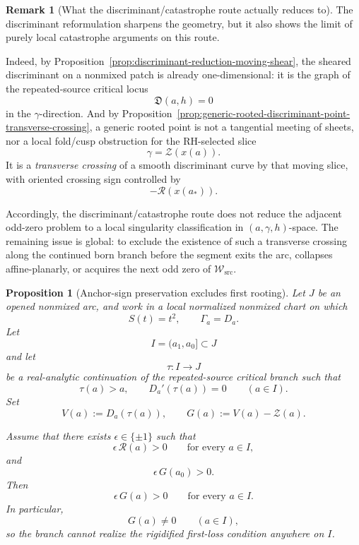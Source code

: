 \documentclass[11pt,a4paper]{amsart}
\theoremstyle{plain}
\newtheorem{proposition}[theorem]{Proposition}
\theoremstyle{definition}
\newtheorem{remark}[theorem]{Remark}
\begin{document}
\begin{remark}[What the discriminant/catastrophe route actually reduces to]
\label{rem:what-discriminant-catastrophe-route-actually-reduces-to}
The discriminant reformulation sharpens the geometry, but it also shows the
limit of purely local catastrophe arguments on this route.

Indeed, by
Proposition~\ref{prop:discriminant-reduction-moving-shear},
the sheared discriminant on a nonmixed patch is already one-dimensional:
it is the graph of the repeated-source critical locus
\[
\mathfrak D(a,h)=0
\]
in the $\gamma$-direction. And by
Proposition~\ref{prop:generic-rooted-discriminant-point-transverse-crossing},
a generic rooted point is not a tangential meeting of sheets, nor a local
fold/cusp obstruction for the RH-selected slice
\[
\gamma=\mathcal Z(x(a)).
\]
It is a \emph{transverse crossing} of a smooth discriminant curve by that
moving slice, with oriented crossing sign controlled by
\[
-\mathcal R(x(a_*)).
\]

Accordingly, the discriminant/catastrophe route does not reduce the adjacent
odd-zero problem to a local singularity classification in
$(a,\gamma,h)$-space. The remaining issue is global: to exclude the existence
of such a transverse crossing along the continued born branch before the
segment exits the arc, collapses affine-planarly, or acquires the next odd
zero of $\mathcal W_{\mathrm{src}}$.
\end{remark}

\begin{proposition}[Anchor-sign preservation excludes first rooting]
\label{prop:anchor-sign-preservation-excludes-first-rooting}
Let $J$ be an opened nonmixed arc, and work in a local normalized nonmixed
chart on which
\[
S(t)=t^2,
\qquad
\Gamma_a=D_a.
\]
Let
\[
I=(a_1,a_0]\subset J
\]
and let
\[
\tau:I\to J
\]
be a real-analytic continuation of the repeated-source critical branch such that
\[
\tau(a)>a,
\qquad
D_a'(\tau(a))=0
\qquad (a\in I).
\]
Set
\[
V(a):=D_a(\tau(a)),
\qquad
G(a):=V(a)-\mathcal Z(a).
\]

Assume that there exists $\epsilon\in\{\pm1\}$ such that
\[
\epsilon\,\mathcal R(a)>0
\qquad\text{for every }a\in I,
\]
and
\[
\epsilon\,G(a_0)>0.
\]
Then
\[
\epsilon\,G(a)>0
\qquad\text{for every }a\in I.
\]
In particular,
\[
G(a)\neq 0
\qquad (a\in I),
\]
so the branch cannot realize the rigidified first-loss condition anywhere on
$I$.
\end{proposition}
\end{document}
